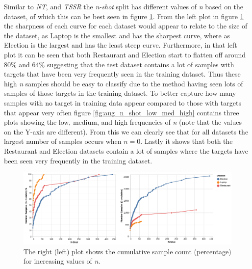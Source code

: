 Similar to \textit{NT}, and \textit{TSSR} the \textit{n-shot} split has different values of \textit{n} based on the dataset, of which this can be best seen in figure \ref{fig:aug_n_shot_cuml}. From the left plot in figure \ref{fig:aug_n_shot_cuml} the sharpness of each curve for each dataset would appear to relate to the size of the dataset, as Laptop is the smallest and has the sharpest curve, where as Election is the largest and has the least steep curve. Furthermore, in that left plot it can be seen that both Restaurant and Election start to flatten off around 80\% and 64\% suggesting that the test dataset contains a lot of samples with targets that have been very frequently seen in the training dataset. Thus these high \textit{n} samples should be easy to classify due to the method having seen lots of samples of those targets in the training dataset. To better capture how many samples with no target in training data appear compared to those with targets that appear very often figure \ref{fig:aug_n_shot_low_med_high} contains three plots showing the low, medium, and high frequencies of \textit{n} (note that the values on the Y-axis are different). From this we can clearly see that for all datasets the largest number of samples occurs when $n=0$. Lastly it shows that both the Restaurant and Election datasets contain a lot of samples where the targets have been seen very frequently in the training dataset.

\begin{figure}[h!]
    \centering
    \includegraphics[scale=0.35]{images/augmentation/error_analysis/n_shot_cuml.png}
    \caption{The right (left) plot shows the cumulative sample count (percentage) for increasing values of \textit{n}.}
    \label{fig:aug_n_shot_cuml}
\end{figure}

